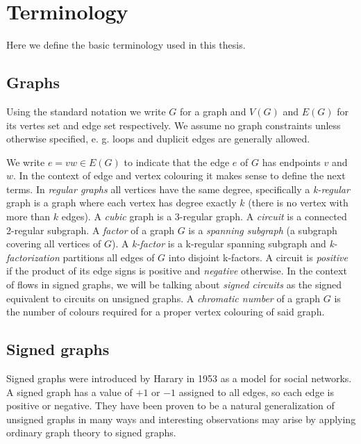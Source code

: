 \chapter{Terminology}\label{ch:terminology}

Here we define the basic terminology used in this thesis.

\section{Graphs}

Using the standard notation we write $G$ for a graph and $V(G)$ and $E(G)$ for its vertes set and edge set respectively.
We assume no graph constraints unless otherwise specified, e. g. loops and duplicit edges are generally allowed.

We write $e = vw \in E(G)$ to indicate that the edge $e$ of $G$ has endpoints $v$ and $w$.
In the context of edge and vertex colouring it makes sense to define the next terms. In \textit{regular graphs} all vertices have the same degree, specifically
a \textit{k-regular} graph is a graph where each vertex has degree exactly $k$ (there is no vertex with more than $k$ edges).
A \textit{cubic} graph is a 3-regular graph.
A \textit{circuit} is a connected 2-regular subgraph. A \textit{factor} of a graph $G$ is a \textit{spanning subgraph} (a subgraph covering all vertices of $G$).
A \textit{k-factor} is a k-regular spanning subgraph and \textit{k-factorization} partitions all edges of $G$ into disjoint k-factors.
A circuit is \textit{positive} if the product of its edge signs is positive and
\textit{negative} otherwise. In the context of flows in signed graphs, we will be talking about \textit{signed circuits}
as the signed equivalent to circuits on unsigned graphs.
A \textit{chromatic number} of a graph $G$ is the number of colours required for a proper vertex colouring of said graph.

\section{Signed graphs}

Signed graphs were introduced by Harary\cite{harary} in 1953 as a model for social networks.
A signed graph has a value of $+1$ or $-1$ assigned to all edges, so each edge is positive or negative.
They have been proven to be a natural generalization of unsigned graphs in many ways and interesting observations may arise
by applying ordinary graph theory to signed graphs.

